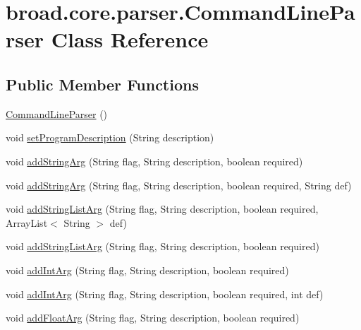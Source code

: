 \hypertarget{classbroad_1_1core_1_1parser_1_1_command_line_parser}{\section{broad.\+core.\+parser.\+Command\+Line\+Parser Class Reference}
\label{classbroad_1_1core_1_1parser_1_1_command_line_parser}
}
\subsection*{Public Member Functions}
\begin{DoxyCompactItemize}
\item 
\hyperlink{classbroad_1_1core_1_1parser_1_1_command_line_parser_aca48b6e3ce81bf026ce5dd86d0b39287}{Command\+Line\+Parser} ()
\item 
void \hyperlink{classbroad_1_1core_1_1parser_1_1_command_line_parser_a80bd6dcaaa8cac1cdc089ba3d9627f24}{set\+Program\+Description} (String description)
\item 
void \hyperlink{classbroad_1_1core_1_1parser_1_1_command_line_parser_aa45de7ab4457124cb187347665a4da05}{add\+String\+Arg} (String flag, String description, boolean required)
\item 
void \hyperlink{classbroad_1_1core_1_1parser_1_1_command_line_parser_a3cc73b6a3ae84ab16d3e500384fe1609}{add\+String\+Arg} (String flag, String description, boolean required, String def)
\item 
void \hyperlink{classbroad_1_1core_1_1parser_1_1_command_line_parser_a0d5d15695b32e2ebe4e3d8c22ecb857f}{add\+String\+List\+Arg} (String flag, String description, boolean required, Array\+List$<$ String $>$ def)
\item 
void \hyperlink{classbroad_1_1core_1_1parser_1_1_command_line_parser_aa0f40e30d43b7d2dd3a2f5765daed1bc}{add\+String\+List\+Arg} (String flag, String description, boolean required)
\item 
void \hyperlink{classbroad_1_1core_1_1parser_1_1_command_line_parser_ac64f3bd75600400d5918592a9886f0a0}{add\+Int\+Arg} (String flag, String description, boolean required)
\item 
void \hyperlink{classbroad_1_1core_1_1parser_1_1_command_line_parser_a7c2d0496cbec72be20f2d40c71e6b50a}{add\+Int\+Arg} (String flag, String description, boolean required, int def)
\item 
void \hyperlink{classbroad_1_1core_1_1parser_1_1_command_line_parser_a5d9cc79fff4b57c989d81f23d1846f5e}{add\+Float\+Arg} (String flag, String description, boolean required)

\end{DoxyCompactItemize}
